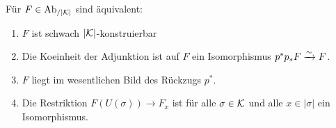 \begin{prop}[\cite{WS}, 8.4.6.3] \label{sk-char}
  Für $F \in \operatorname{Ab}_{/|\mathcal{K}|}$ sind äquivalent:
  \begin{enumerate}[label=(\arabic*)]
  \item \label{itm:sk-char-sk} $F$ ist schwach $|\mathcal{K}|$-konstruierbar
  \item \label{itm:sk-char-counit} Die Koeinheit der Adjunktion ist
    auf $F$ ein Isomorphismus $p^*p_*F \xrightarrow[]{\sim} F$.
  \item \label{itm:sk-char-essim} $F$ liegt im wesentlichen Bild des
    Rückzugs $p^*$.
  \item \label{itm:sk-char-res} Die Restriktion $F(U(\sigma)) \to F_x$
    ist für alle $\sigma \in \mathcal{K}$ und alle $x \in |\sigma|$ ein
    Isomorphismus.
  \end{enumerate}
\end{prop}
